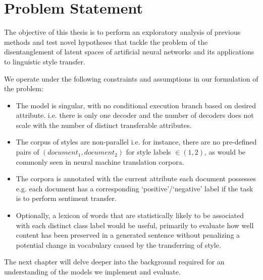 \section{Problem Statement}

The objective of this thesis is to perform an exploratory analysis of previous methods and test novel hypotheses that tackle the problem of the disentanglement of latent spaces of artificial neural networks and its applications to linguistic style transfer.

We operate under the following constraints and assumptions in our formulation of the problem:

\begin{itemize}
	\item The model is singular, with no conditional execution branch based on desired attribute. i.e. there is only one decoder and the number of decoders does not scale with the number of distinct transferable attributes.
	\item The corpus of styles are non-parallel i.e. for instance, there are no pre-defined pairs of $(document_1, document_2)$ for style labels $\in (1, 2)$, as would be commonly seen in neural machine translation corpora.
	\item The corpora is annotated with the current attribute each document possesses e.g. each document has a corresponding `positive'/`negative' label if the task is to perform sentiment transfer.
	\item Optionally, a lexicon of words that are statistically likely to be associated with each distinct class label would be useful, primarily to evaluate how well content has been preserved in a generated sentence without penalizing a potential change in vocabulary caused by the transferring of style.
\end{itemize}


The next chapter will delve deeper into the background required for an understanding of the models we implement and evaluate.

